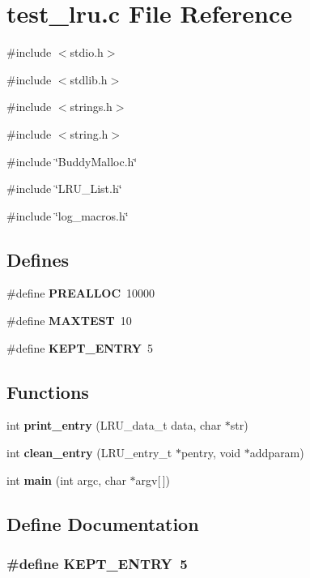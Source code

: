 \section{test\_\-lru.c File Reference}
\label{test__lru_8c}
{\ttfamily \#include $<$stdio.h$>$}\par
{\ttfamily \#include $<$stdlib.h$>$}\par
{\ttfamily \#include $<$strings.h$>$}\par
{\ttfamily \#include $<$string.h$>$}\par
{\ttfamily \#include \char`\"{}BuddyMalloc.h\char`\"{}}\par
{\ttfamily \#include \char`\"{}LRU\_\-List.h\char`\"{}}\par
{\ttfamily \#include \char`\"{}log\_\-macros.h\char`\"{}}\par
\subsection*{Defines}
\begin{DoxyCompactItemize}
\item 
\#define {\bf PREALLOC}~10000
\item 
\#define {\bf MAXTEST}~10
\item 
\#define {\bf KEPT\_\-ENTRY}~5
\end{DoxyCompactItemize}
\subsection*{Functions}
\begin{DoxyCompactItemize}
\item 
int {\bf print\_\-entry} (LRU\_\-data\_\-t data, char $\ast$str)
\item 
int {\bf clean\_\-entry} (LRU\_\-entry\_\-t $\ast$pentry, void $\ast$addparam)
\item 
int {\bf main} (int argc, char $\ast$argv[$\,$])
\end{DoxyCompactItemize}


\subsection{Define Documentation}
\subsubsection[{KEPT\_\-ENTRY}]{\setlength{\rightskip}{0pt plus 5cm}\#define KEPT\_\-ENTRY~5}\label{test__lru_8c_a32947fb41aad50de0587ec096a0daebc}


